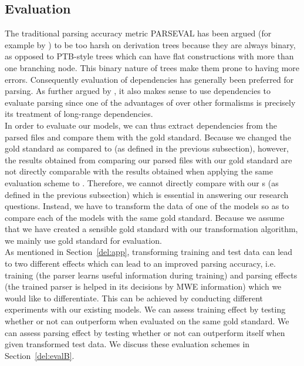 \documentclass[output=paper]{langsci/langscibook}
\begin{document}
    \subsection{Evaluation}
    \label{del:sec:eval}
    \indent The traditional parsing accuracy metric PARSEVAL has been argued (for example  by \citet{clark2002evaluating}) to be too harsh on  derivation trees because they are always binary, as opposed to PTB-style trees which can have flat constructions with more than one branching node. This binary nature of  trees make them prone to having more errors. Consequently evaluation of dependencies has generally been preferred for  parsing. As further argued by \citet{clark2002evaluating}, it also makes sense to use dependencies to evaluate  parsing since one of the advantages of  over other formalisms is precisely its treatment of long-range dependencies.\\
    \indent In order to evaluate our models, we can thus extract dependencies from the parsed files and compare them with the gold standard. Because we changed the gold standard as compared to {\modelA} (as defined in the previous subsection), however, the results obtained from comparing our parsed files with our gold standard are not directly comparable with the results obtained when applying the same evaluation scheme to {\modelA}. Therefore, we cannot directly compare {\modelA} with our {\modelB} s (as defined in the previous subsection) which is essential in answering our research questions. Instead, we have to transform the data of one of the models so as to compare each of the models with the same gold standard. Because we assume that we have created a sensible gold standard with our transformation algorithm, we mainly use gold standard for evaluation. \\
    \indent As mentioned in Section~\ref{del:app}, transforming training and test data can lead to two different effects which can lead to an improved parsing accuracy, i.e. training (the parser learns useful information during training) and parsing effects (the trained parser is helped in its decisions by MWE information) which we would like to differentiate. This can be achieved by conducting different experiments with our existing models. We can assess training effect by testing whether or not {\modelB} can outperform {\modelA} when evaluated on the same gold standard. We can assess parsing effect by testing whether or not {\modelA} can outperform itself when given transformed test data. We discuss these evaluation schemes in Section~\ref{del:evalB}. \\
\end{document}

